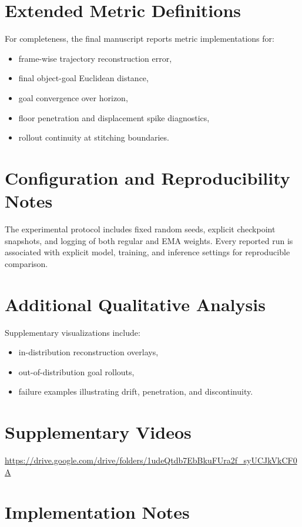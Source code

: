 \section{Extended Metric Definitions}

For completeness, the final manuscript reports metric implementations for:
\begin{itemize}
	\item frame-wise trajectory reconstruction error,
	\item final object-goal Euclidean distance,
	\item goal convergence over horizon,
	\item floor penetration and displacement spike diagnostics,
	\item rollout continuity at stitching boundaries.
\end{itemize}

\section{Configuration and Reproducibility Notes}

The experimental protocol includes fixed random seeds, explicit checkpoint snapshots, and logging of both regular and EMA weights. Every reported run is associated with explicit model, training, and inference settings for reproducible comparison.

\section{Additional Qualitative Analysis}

Supplementary visualizations include:
\begin{itemize}
	\item in-distribution reconstruction overlays,
	\item out-of-distribution goal rollouts,
	\item failure examples illustrating drift, penetration, and discontinuity.
\end{itemize}

\section{Supplementary Videos}

\url{https://drive.google.com/drive/folders/1udeQtdb7EbBkuFUra2f_syUCJkVkCF0A}

\section{Implementation Notes}

